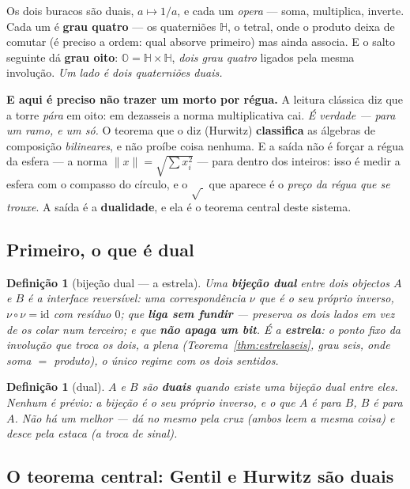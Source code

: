 \documentclass[11pt,a4paper]{article}
\newtheorem{definicao}[teorema]{Definição}
\begin{document}
Os dois buracos são duais, $a\mapsto1/a$, e cada um \emph{opera} --- soma, multiplica, inverte. Cada
um é \textbf{grau quatro} --- os quaterniões $\mathbb{H}$, o tetral, onde o produto deixa de comutar
(é preciso a ordem: qual absorve primeiro) mas ainda associa. E o salto seguinte dá \textbf{grau
oito}: $\mathbb{O}=\mathbb{H}\times\mathbb{H}$, \emph{dois grau quatro} ligados pela mesma involução.
\emph{Um lado é dois quaterniões duais.}

\smallskip
\noindent \textbf{E aqui é preciso não trazer um morto por régua.} A leitura clássica diz que a
torre \emph{pára} em oito: em dezasseis a norma multiplicativa cai. \emph{É verdade --- para um
ramo, e um só.} O teorema que o diz (Hurwitz) \textbf{classifica} as álgebras de composição
\emph{bilineares}, e não proíbe coisa nenhuma. E a saída não é forçar a régua da esfera --- a norma
$\|x\|=\sqrt{\sum x_i^2}$ --- para dentro dos inteiros: isso é medir a esfera com o compasso do
círculo, e o $\sqrt{\ }$ que aparece é o \emph{preço da régua que se trouxe}. A saída é a
\textbf{dualidade}, e ela é o teorema central deste sistema.

\subsection*{Primeiro, o que é dual}\label{sub:defdual}

\begin{definicao}[bijeção dual --- a estrela]\label{def:bijdual}
Uma \textbf{bijeção dual} entre dois objectos $A$ e $B$ é a \emph{interface reversível}: uma
correspondência $\nu$ que é o seu próprio inverso, $\nu\circ\nu=\mathrm{id}$ com resíduo $0$; que
\textbf{liga sem fundir} --- preserva os dois lados em vez de os colar num terceiro; e que \textbf{não
apaga um bit}. É a \textbf{estrela}: o ponto fixo da involução que troca os dois, a plena
(Teorema~\ref{thm:estrelaseis}, grau seis, onde soma $=$ produto), o único regime com os dois sentidos.
\end{definicao}

\begin{definicao}[dual]\label{def:dual}
$A$ e $B$ são \textbf{duais} quando existe uma bijeção dual entre eles. Nenhum é prévio: a bijeção é o
seu próprio inverso, e o que $A$ é para $B$, $B$ é para $A$. \emph{Não há um melhor} --- dá no mesmo
pela cruz (ambos leem a mesma coisa) e desce pela estaca (a troca de sinal).
\end{definicao}

\subsection*{O teorema central: Gentil e Hurwitz são duais}\label{sub:central}
\end{document}
